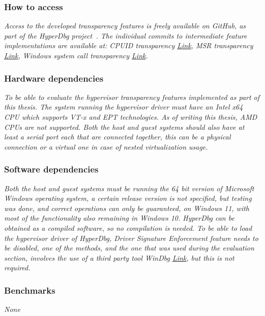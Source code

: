 \subsubsection{How to access}
\textit{Access to the developed transparency features is freely available on GitHub, as part of the HyperDbg project~\cite{hyperdbg}. 
The individual commits to intermediate feature implementations are available at: CPUID transparency \href{https://github.com/HyperDbg/HyperDbg/commit/56c2d400fddca22f314c1e5d16cadce6950eb262}{Link}, 
MSR transparency \href{https://github.com/HyperDbg/HyperDbg/commit/2cc3da3daebd793fd56d5c370ef6da398efa6d29}{Link}, Windows system call
transparency \href{https://github.com/HyperDbg/HyperDbg/commit/d0610661baf944259c33e921d3fc265e6a217ad8}{Link}.
}


\subsubsection{Hardware dependencies}
\textit{To be able to evaluate the hypervisor transparency features implemented as part of this thesis.
The system running the hypervisor driver must have an Intel x64 CPU which supports VT-x and EPT technologies. As of writing this thesis, AMD CPUs are not supported.
Both the host and guest systems should also have at least a serial port each that are connected together, this can be a physical connection or a virtual one in case of nested virtualization usage.}

\subsubsection{Software dependencies}
\textit{Both the host and guest systems must be running the 64 bit version of Microsoft Windows operating system,
a certain release version is not specified, but testing was done, and correct operations can only be guaranteed, on Windows 11, with most of the functionality also remaining in Windows 10.
HyperDbg can be obtained as a compiled software, so no compilation is needed. To be able to load the hypervisor driver of HyperDbg,
Driver Signature Enforcement feature needs to be disabled, one of the methods, and the one that was used during the evaluation section, involves the use of a third party tool WinDbg \href{https://github.com/HyperDbg/HyperDbg/commit/2cc3da3daebd793fd56d5c370ef6da398efa6d29}{Link}, but this is not required.}

\subsubsection{Benchmarks}
\textit{None}

